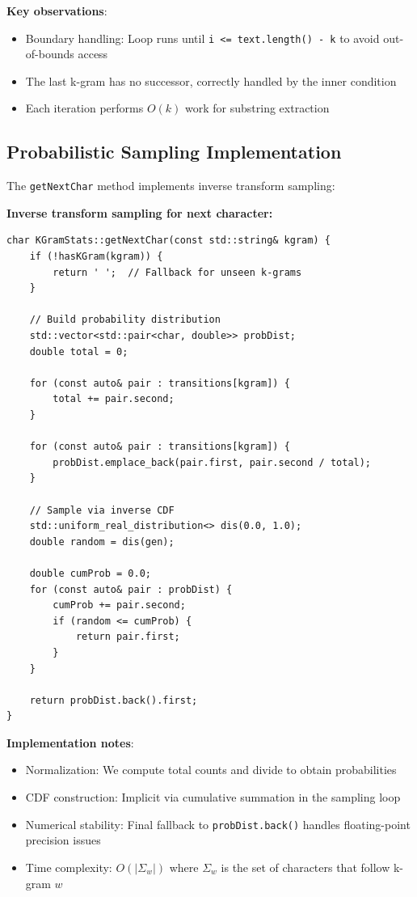 \documentclass[11pt,letterpaper]{article}
\begin{document}
\textbf{Key observations}:
\begin{itemize}
    \item Boundary handling: Loop runs until \texttt{i <= text.length() - k} to avoid out-of-bounds access
    \item The last k-gram has no successor, correctly handled by the inner condition
    \item Each iteration performs $O(k)$ work for substring extraction
\end{itemize}

\subsection{Probabilistic Sampling Implementation}

The \texttt{getNextChar} method implements inverse transform sampling:

\textbf{Inverse transform sampling for next character:}
\begin{verbatim}
char KGramStats::getNextChar(const std::string& kgram) {
    if (!hasKGram(kgram)) {
        return ' ';  // Fallback for unseen k-grams
    }
    
    // Build probability distribution
    std::vector<std::pair<char, double>> probDist;
    double total = 0;
    
    for (const auto& pair : transitions[kgram]) {
        total += pair.second;
    }
    
    for (const auto& pair : transitions[kgram]) {
        probDist.emplace_back(pair.first, pair.second / total);
    }
    
    // Sample via inverse CDF
    std::uniform_real_distribution<> dis(0.0, 1.0);
    double random = dis(gen);
    
    double cumProb = 0.0;
    for (const auto& pair : probDist) {
        cumProb += pair.second;
        if (random <= cumProb) {
            return pair.first;
        }
    }
    
    return probDist.back().first;
}
\end{verbatim}

\textbf{Implementation notes}:
\begin{itemize}
    \item Normalization: We compute total counts and divide to obtain probabilities
    \item CDF construction: Implicit via cumulative summation in the sampling loop
    \item Numerical stability: Final fallback to \texttt{probDist.back()} handles floating-point precision issues
    \item Time complexity: $O(|\Sigma_w|)$ where $\Sigma_w$ is the set of characters that follow k-gram $w$
\end{itemize}
\end{document}
